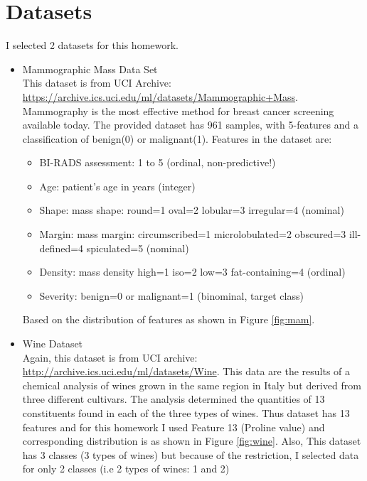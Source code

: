 \documentclass[11pt, pdftex]{article}
\title{Assignment (MiniProject) #1}
\author{Machiry Aravind Kumar}
\date{UCSB}
\begin{document}
\maketitle
\section{Datasets}
I selected 2 datasets for this homework.
\begin{itemize}
\item Mammographic Mass Data Set\\
This dataset is from UCI Archive: \url{https://archive.ics.uci.edu/ml/datasets/Mammographic+Mass}. Mammography is the most effective method for breast cancer screening available today. The provided dataset has 961 samples, with 5-features and a classification of benign(0) or malignant(1). Features in the dataset are:
\begin{itemize}
\item BI-RADS assessment: 1 to 5 (ordinal, non-predictive!)
\item Age: patient's age in years (integer)
\item Shape: mass shape: round=1 oval=2 lobular=3 irregular=4 (nominal)
\item Margin: mass margin: circumscribed=1 microlobulated=2 obscured=3 ill-defined=4 spiculated=5 (nominal)
\item Density: mass density high=1 iso=2 low=3 fat-containing=4 (ordinal) 
\item Severity: benign=0 or malignant=1 (binominal, target class) 
\end{itemize}
Based on the distribution of features as shown in Figure \ref{fig:mam}.
\item Wine Dataset \\
Again, this dataset is from UCI archive: \url{http://archive.ics.uci.edu/ml/datasets/Wine}. This data are the results of a chemical analysis of wines grown in the same region in Italy but derived from three different cultivars. The analysis determined the quantities of 13 constituents found in each of the three types of wines. Thus dataset has 13 features and for this homework I used Feature 13 (Proline value) and corresponding distribution is as shown in Figure \ref{fig:wine}. Also, This dataset has 3 classes (3 types of wines) but because of the restriction, I selected data for only 2 classes (i.e 2 types of wines: 1 and 2)
\end{itemize}
\end{document}
